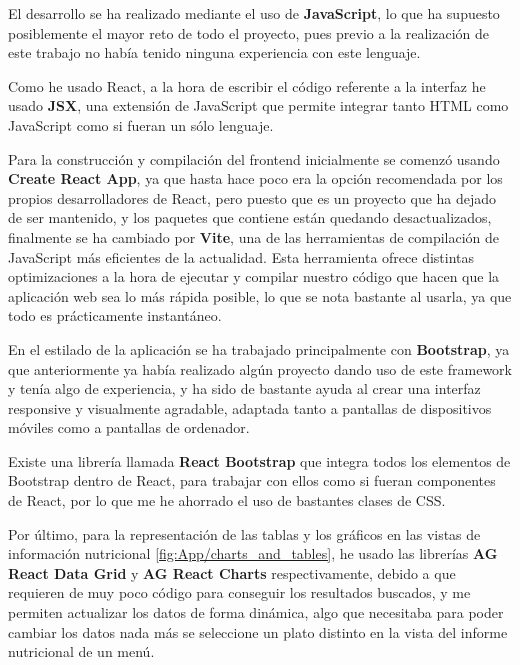 
El desarrollo se ha realizado mediante el uso de \textbf{JavaScript}, lo que ha supuesto posiblemente el mayor reto de todo el proyecto, pues previo a la realización de este trabajo no había tenido ninguna experiencia con este lenguaje.

Como he usado React, a la hora de escribir el código referente a la interfaz he usado \textbf{JSX}, una extensión de JavaScript que permite integrar tanto HTML como JavaScript como si fueran un sólo lenguaje.

Para la construcción y compilación del frontend inicialmente se comenzó usando \textbf{Create React App}, ya que hasta hace poco era la opción recomendada por los propios desarrolladores de React, pero puesto que es un proyecto que ha dejado de ser mantenido, y los paquetes que contiene están quedando desactualizados, finalmente se ha cambiado por \textbf{Vite}, una de las herramientas de compilación de JavaScript más eficientes de la actualidad. Esta herramienta ofrece distintas optimizaciones a la hora de ejecutar y compilar nuestro código que hacen que la aplicación web sea lo más rápida posible, lo que se nota bastante al usarla, ya que todo es prácticamente instantáneo.

En el estilado de la aplicación se ha trabajado principalmente con \textbf{Bootstrap}, ya que anteriormente ya había realizado algún proyecto dando uso de este framework y tenía algo de experiencia, y ha sido de bastante ayuda al crear una interfaz responsive y visualmente agradable, adaptada tanto a pantallas de dispositivos móviles como a pantallas de ordenador. 

Existe una librería llamada \textbf{React Bootstrap} que integra todos los elementos de Bootstrap dentro de React, para trabajar con ellos como si fueran componentes de React, por lo que me he ahorrado el uso de bastantes clases de CSS.

Por último, para la representación de las tablas y los gráficos en las vistas de información nutricional \ref{fig:App/charts_and_tables}, he usado las librerías \textbf{AG React Data Grid} y \textbf{AG React Charts} respectivamente, debido a que requieren de muy poco código para conseguir los resultados buscados, y me permiten actualizar los datos de forma dinámica, algo que necesitaba para poder cambiar los datos nada más se seleccione un plato distinto en la vista del informe nutricional de un menú.

